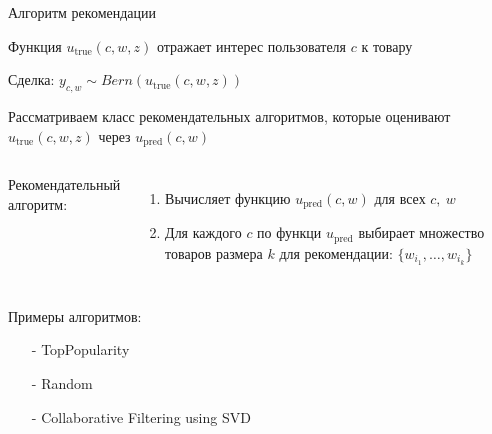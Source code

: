 \documentclass{beamer}
\begin{document}
\begin{frame}{Алгоритм рекомендации}

\item  \footnotesize Функция $u_{\text{true}}(c, w, z)$ отражает интерес пользователя $c$ к товару

\item  \footnotesize Сделка: $y_{c,w} \sim Bern(u_{\text{true}}(c, w, z))$

\item Рассматриваем класс рекомендательных алгоритмов, которые оценивают $u_{\text{true}}(c, w, z)$ через $u_{\text{pred}}(c, w)$

\begin{columns}[c]

    Рекомендательный алгоритм:
        \begin{enumerate}
            \item Вычисляет функцию $u_{\text{pred}}(c, w)$ для всех $c,\ w$
            \item Для каждого $c$ по функци $u_{\text{pred}}$ выбирает множество товаров размера $k$ для рекомендации: $\{w_{i_1},\ldots, w_{i_k}\}$
        \end{enumerate}
    

\end{columns}
Примеры алгоритмов:

    \begin{itemize}
        \item[-] TopPopularity
        \item[-] Random
        \item[-] Collaborative Filtering using SVD
    \end{itemize}    
    
\end{frame}
\end{document}
